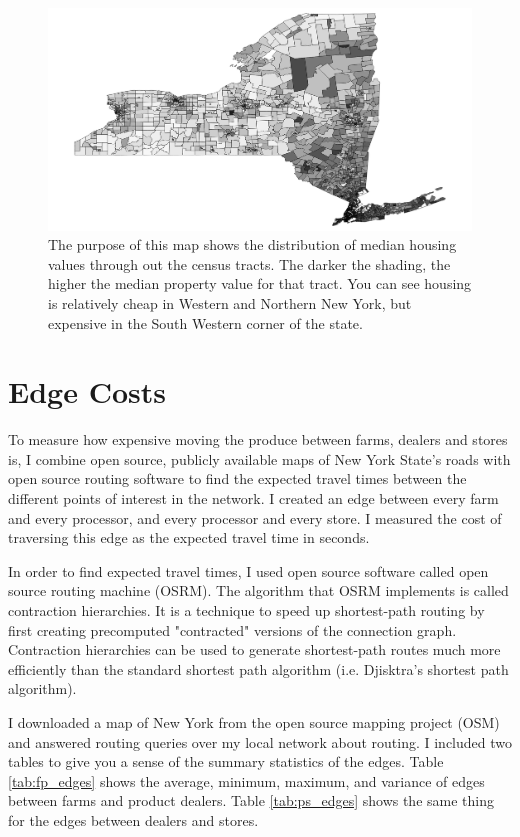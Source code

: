 \documentclass{report}
\begin{document}
\begin{figure}
\centering
\begin{framed}
\includegraphics[scale=.39]{map_4}
\caption{The purpose of this map shows the distribution of median housing values through out the census tracts. The darker the shading, the higher the median property value for that tract. You can see housing is relatively cheap in Western and Northern New York, but expensive in the South Western corner of the state.}
\label{fig:map_4}
\end{framed}
\end{figure}

\section{Edge Costs}

To measure how expensive moving the produce between farms, dealers and stores is, I combine open source, publicly available maps of New York State's roads with open source routing software to find the expected travel times between the different points of interest in the network. I created an edge between every farm and every processor, and every processor and every store. I measured the cost of traversing this edge as the expected travel time in seconds. 

In order to find expected travel times, I used open source software called open source routing machine (OSRM). The algorithm that OSRM implements is called contraction hierarchies. It is a technique to speed up shortest-path routing by first creating precomputed "contracted" versions of the connection graph. Contraction hierarchies can be used to generate shortest-path routes much more efficiently than the standard shortest path algorithm (i.e. Djisktra's shortest path algorithm).

I downloaded a map of New York from the open source mapping project (OSM) and answered routing queries over my local network about routing. I included two tables to give you a sense of the summary statistics of the edges. Table \ref{tab:fp_edges} shows the average, minimum, maximum, and variance of edges between farms and product dealers. Table \ref{tab:ps_edges} shows the same thing for the edges between dealers and stores.
\end{document}

